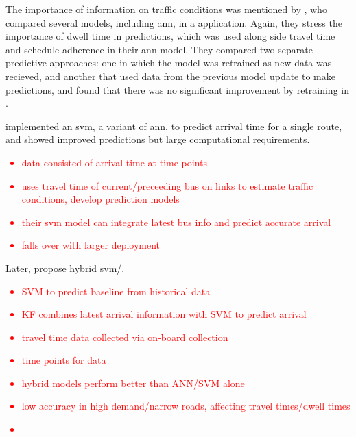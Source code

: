 The importance of \rt{} information on traffic conditions
was mentioned by \cite{Jeong_2005},
who compared several models, including \gls{ann},
in a \rt{} application.
Again, they stress the importance of dwell time in predictions,
which was used along side travel time and
schedule adherence in their \gls{ann} model.
They compared two separate predictive approaches:
one in which the model was retrained as new data was recieved,
and another that used data from the previous model update to make predictions,
and found that there was no significant improvement by
retraining in \rt{}.



\cite{Yu_2006} implemented an \gls{svm}, a variant of \gls{ann},
to predict arrival time for a single route,
and showed improved predictions but large computational requirements.

\textcolor{red}{
    \singlespacing
    \begin{itemize}
        \item data consisted of arrival time at time points
        \item uses travel time of current/preceeding bus on links
            to estimate traffic conditions, develop prediction models
        \item their \gls{svm} model can integrate latest bus info
            and predict accurate arrival
        \item falls over with larger deployment
    \end{itemize}
}

Later, \cite{Yu_2010} propose hybrid \gls{svm}/\kf{}.
\textcolor{red}{
    \singlespacing
    \begin{itemize}
        \item SVM to predict baseline from historical data
        \item KF combines latest arrival information with
            SVM to predict arrival
        \item travel time data collected via on-board collection
        \item time points for \rt{} data
        \item \kf{} hybrid models perform better than ANN/SVM alone
        \item low accuracy in high demand/narrow roads,
            affecting travel times/dwell times
    \end{itemize}
}

\cite{Chang_2010}
\textcolor{red}{
    \singlespacing
    \begin{itemize}
        \item
    \end{itemize}
}

